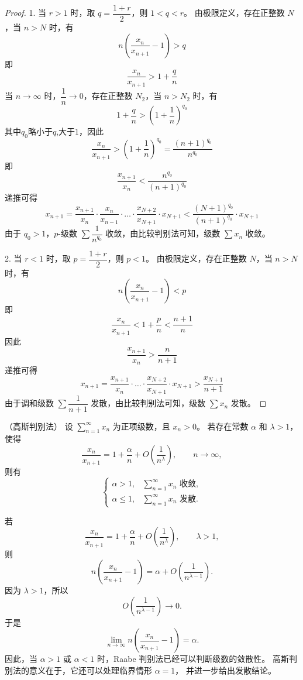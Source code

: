 \begin{proof}
	1.  当 $r > 1$ 时，取 $q = \dfrac{1+r}{2}$，则 $1 < q < r$。
	由极限定义，存在正整数 $N$，当 $n > N$ 时，有
	\[
	n \left( \frac{x_n}{x_{n+1}} - 1 \right) > q
	\]
	即
	\[
	\frac{x_n}{x_{n+1}} > 1 + \frac{q}{n}
	\]
	当 $n \to \infty$ 时，$\dfrac{1}{n} \to 0$，存在正整数 $N_2$，当 $n > N_2$ 时，有
	\[
	1 + \frac{q}{n} > \left( 1 + \frac{1}{n} \right)^{q_0}
	\]
	其中$q_0$略小于$q$,大于$1$，因此
	\[
	\frac{x_n}{x_{n+1}} > \left( 1 + \frac{1}{n} \right)^{q_0} = \frac{(n+1)^{q_0}}{n^{q_0}}
	\]
	即
	\[
	\frac{x_{n+1}}{x_n} < \frac{n^{q_0}}{(n+1)^{q_0}}
	\]
	递推可得
	\[
	x_{n+1} = \frac{x_{n+1}}{x_n} \cdot \frac{x_n}{x_{n-1}} \cdot \dots \cdot \frac{x_{N+2}}{x_{N+1}} \cdot x_{N+1} < \frac{(N+1)^{q_0}}{(n+1)^{q_0}} \cdot x_{N+1}
	\]
	由于 ${q_0} > 1$，$p$-级数 $\sum \dfrac{1}{n^{q_0}}$ 收敛，由比较判别法可知，级数 $\sum x_n$ 收敛。
	
	2.  当 $r < 1$ 时，取 $p = \dfrac{1+r}{2}$，则 $p < 1$。
	由极限定义，存在正整数 $N$，当 $n > N$ 时，有
	\[
	n \left( \frac{x_n}{x_{n+1}} - 1 \right) < p
	\]
	即
	\[
	\frac{x_n}{x_{n+1}} < 1 + \frac{p}{n} < \frac{n+1}{n}
	\]
	因此
	\[
	\frac{x_{n+1}}{x_n} > \frac{n}{n+1}
	\]
	递推可得
	\[
	x_{n+1} = \frac{x_{n+1}}{x_n} \cdot \dots \cdot \frac{x_{N+2}}{x_{N+1}} \cdot x_{N+1} > \frac{x_{N+1}}{n+1}
	\]
	由于调和级数 $\sum \dfrac{1}{n+1}$ 发散，由比较判别法可知，级数 $\sum x_n$ 发散。
	
	
\end{proof}



\begin{proposition}
	（高斯判别法）
	设 $\sum\limits_{n=1}^{\infty} x_n$ 为正项级数，且 $x_n>0$。
	若存在常数 $\alpha$ 和 $\lambda>1$，使得
	\[
	\frac{x_n}{x_{n+1}}
	=
	1+\frac{\alpha}{n}+O\left(\frac{1}{n^\lambda}\right),
	\qquad n\to\infty,
	\]
	则有
	\[
	\begin{cases}
		\alpha>1, & \displaystyle \sum_{n=1}^{\infty}x_n \text{ 收敛},\\[6pt]
		\alpha\leq 1, & \displaystyle \sum_{n=1}^{\infty}x_n \text{ 发散}.
	\end{cases}
	\]
\end{proposition}
若
\[
\frac{x_n}{x_{n+1}}
=
1+\frac{\alpha}{n}+O\left(\frac{1}{n^\lambda}\right),
\qquad \lambda>1,
\]
则
\[
n\left(\frac{x_n}{x_{n+1}}-1\right)
=
\alpha+O\left(\frac{1}{n^{\lambda-1}}\right).
\]
因为 $\lambda>1$，所以
\[
O\left(\frac{1}{n^{\lambda-1}}\right)\to 0.
\]
于是
\[
\lim_{n\to\infty}
n\left(\frac{x_n}{x_{n+1}}-1\right)
=
\alpha.
\]
因此，当 $\alpha>1$ 或 $\alpha<1$ 时，Raabe 判别法已经可以判断级数的敛散性。
高斯判别法的意义在于，它还可以处理临界情形 $\alpha=1$，
并进一步给出发散结论。


